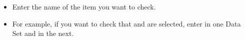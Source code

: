 \begin{itemize}
\item  Enter the name of the item you want to check.
\item For example, if you want to check that  and   are selected, enter  in one Data Set and  in the next. 
\end{itemize}

    